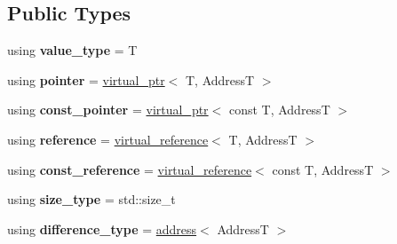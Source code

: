 \subsection*{Public Types}
\begin{DoxyCompactItemize}
\item 
\mbox{\label{classdistant_1_1memory_1_1virtual__allocator_a5097eefa8e1f0b46aa521f6f3d0c0253}} 
using {\bfseries value\+\_\+type} = T
\item 
\mbox{\label{classdistant_1_1memory_1_1virtual__allocator_acc8faacc300591c67badf1c687f670af}} 
using {\bfseries pointer} = \mbox{\hyperlink{classdistant_1_1memory_1_1virtual__ptr}{virtual\+\_\+ptr}}$<$ T, AddressT $>$
\item 
\mbox{\label{classdistant_1_1memory_1_1virtual__allocator_aa7fa8853e9fd1938e6fd0f9ceefd57d6}} 
using {\bfseries const\+\_\+pointer} = \mbox{\hyperlink{classdistant_1_1memory_1_1virtual__ptr}{virtual\+\_\+ptr}}$<$ const T, AddressT $>$
\item 
\mbox{\label{classdistant_1_1memory_1_1virtual__allocator_a4c669f4f3ecb8d4bbc9d408bf34e2db4}} 
using {\bfseries reference} = \mbox{\hyperlink{classdistant_1_1memory_1_1virtual__reference}{virtual\+\_\+reference}}$<$ T, AddressT $>$
\item 
\mbox{\label{classdistant_1_1memory_1_1virtual__allocator_a88342c274eff69899bcc4874b32514d1}} 
using {\bfseries const\+\_\+reference} = \mbox{\hyperlink{classdistant_1_1memory_1_1virtual__reference}{virtual\+\_\+reference}}$<$ const T, AddressT $>$
\item 
\mbox{\label{classdistant_1_1memory_1_1virtual__allocator_a7c04d5aab0eeb3891909441ef962c559}} 
using {\bfseries size\+\_\+type} = std\+::size\+\_\+t
\item 
\mbox{\label{classdistant_1_1memory_1_1virtual__allocator_a7a6974a04f6c47c53b26a1b36de66849}} 
using {\bfseries difference\+\_\+type} = \mbox{\hyperlink{classdistant_1_1memory_1_1address}{address}}$<$ AddressT $>$
\end{DoxyCompactItemize}
